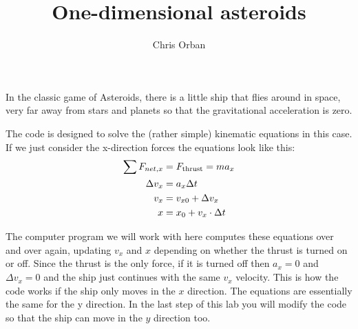 \documentclass{ximera}
\author{Chris Orban}
\title{One-dimensional asteroids}
\begin{document}
\begin{abstract}
\end{abstract}
\maketitle

In the classic game of Asteroids, there is a little ship that flies
around in space, very far away from stars and planets so that the
gravitational acceleration is zero.

The code is designed to solve the (rather simple) kinematic equations
in this case. If we just consider the x-direction forces the equations
look like this:
\begin{align*}
\sum F_{net,x} &= F_{\rm thrust} = ma_x \\
\Delta v_x &= a_x \Delta t \\
v_x &= v_{x0} + \Delta v_x \\
x &= x_0 + v_x \cdot \Delta t
\end{align*}

The computer program we will work with here computes these equations
over and over again, updating $v_x$ and $x$ depending on whether the
thrust is turned on or off. Since the thrust is the only force, if it
is turned off then $a_x = 0$ and $\Delta v_x = 0$ and the ship just
continues with the same $v_x$ velocity. This is how the code works if
the ship only moves in the $x$ direction. The equations are essentially
the same for the y direction. In the last step of this lab you will
modify the code so that the ship can move in the $y$ direction too.
\end{document}
